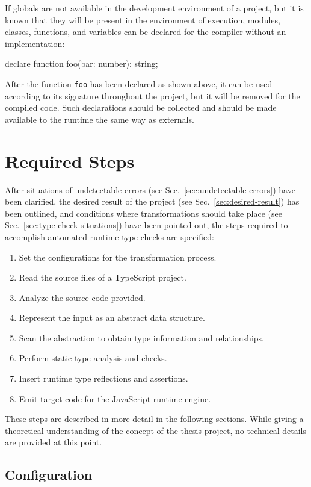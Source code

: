 If globals are not available in the development environment of a project, but it is known that they will be present in the environment of execution, modules, classes, functions, and variables can be declared for the compiler without an implementation:
\begin{JsCode}[numbers=none]
declare function foo(bar: number): string;
\end{JsCode}
After the function \texttt{foo} has been declared as shown above, it can be used according to its signature throughout the project, but it will be removed for the compiled code. Such declarations should be collected and should be made available to the runtime the same way as externals.

\section{Required Steps}
\label{sec:required-steps}

After situations of undetectable errors (see Sec.~\ref{sec:undetectable-errors}) have been clarified, the desired result of the project (see Sec.~\ref{sec:desired-result}) has been outlined, and conditions where transformations should take place (see Sec.~\ref{sec:type-check-situations}) have been pointed out, the steps required to accomplish automated runtime type checks are specified:
\begin{enumerate}
  \item Set the configurations for the transformation process.
  \item Read the source files of a TypeScript project.
  \item Analyze the source code provided.
  \item Represent the input as an abstract data structure.
  \item Scan the abstraction to obtain type information and relationships.
  \item Perform static type analysis and checks.
  \item Insert runtime type reflections and assertions.
  \item Emit target code for the JavaScript runtime engine.
\end{enumerate}
These steps are described in more detail in the following sections. While giving a theoretical understanding of the concept of the thesis project, no technical details are provided at this point.

\subsection{Configuration}
\label{sec:steps-configuration}

